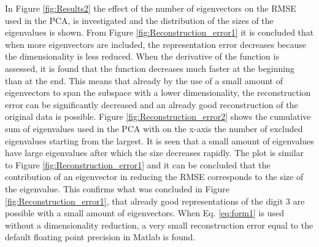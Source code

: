 \documentclass[a4paper,10pt]{article}
\begin{document}
In Figure \ref{fig:Results2} the effect of the number of eigenvectors on the RMSE  used in the PCA, is investigated and the distribution of the sizes of the eigenvalues is shown. From Figure \ref{fig:Reconstruction_error1} it is concluded that when more eigenvectors are included, the representation error decreases because the dimensionality is less reduced. When the derivative of the function is assessed, it is found that the function decreases much faster at the beginning than at the end. This means that already by the use of a small amount of eigenvectors to span the subspace with a lower dimensionality, the reconstruction error can be significantly decreased and an already good reconstruction of the original data is possible. Figure \ref{fig:Reconstruction_error2} shows the cumulative sum of eigenvalues used in the PCA with on the x-axis the number of excluded eigenvalues starting from the largest. It is seen that a small amount of eigenvalues have large eigenvalues after which the size decreases rapidly. The plot is similar to Figure \ref{fig:Reconstruction_error1} and it can be concluded that the contribution of an eigenvector in reducing the RMSE corresponds to the size of the eigenvalue. This confirms what was concluded in Figure \ref{fig:Reconstruction_error1}, that already good representations of the digit 3 are possible with a small amount of eigenvectors. When Eq. \ref{eq:form1} is used without a dimensionality reduction, a very small reconstruction error equal to the default floating point precision in Matlab is found. 
\end{document}
